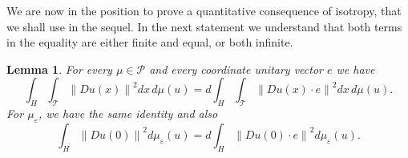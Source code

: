 \documentclass[11pt]{preprint}
\newtheorem{lemma}[theorem]{Lemma}
\begin{document}
We are now in the position to prove a quantitative consequence of isotropy,
that we shall use in the sequel. In the next statement we understand that both
terms in the equality are either finite and equal, or both infinite.

\begin{lemma}
\label{lemmaisotropy}For every $\mu\in\mathcal{P}$ and every coordinate
unitary vector $e$ we have
\[
\int_{H}\int_{\mathcal{T}}\left\|  Du\left(  x\right)  \right\|  ^{2}%
dx\,d\mu\left(  u\right)  =d\int_{H}\int_{\mathcal{T}}\left\|  Du\left(
x\right)  \cdot e\right\|  ^{2}dx\,d\mu\left(  u\right)  .
\]
For $\mu_{\varepsilon}$, we have the same identity and also
\[
\int_{H}\left\|  Du\left(  0\right)  \right\|  ^{2}d\mu_{\varepsilon}\left(
u\right)  =d\int_{H}\left\|  Du\left(  0\right)  \cdot e\right\|  ^{2}%
d\mu_{\varepsilon}\left(  u\right)  .
\]
\end{lemma}
\end{document}
